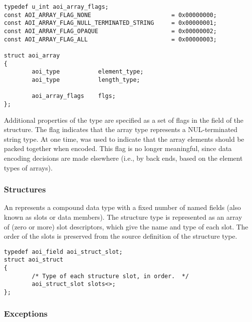 \begin{verbatim}
typedef u_int aoi_array_flags;
const AOI_ARRAY_FLAG_NONE                       = 0x00000000;
const AOI_ARRAY_FLAG_NULL_TERMINATED_STRING     = 0x00000001;
const AOI_ARRAY_FLAG_OPAQUE                     = 0x00000002;
const AOI_ARRAY_FLAG_ALL                        = 0x00000003;

struct aoi_array
{
        aoi_type           element_type;
        aoi_type           length_type;

        aoi_array_flags    flgs;
};
\end{verbatim}

Additional properties of the type are specified as a set of flags in the
 field of the  structure.  The
 flag indicates that the array type
represents a NUL-terminated string type.
At one time,  was used to indicate that the array
elements should be packed together when encoded.  This flag is no longer
meaningful, since data encoding decisions are made elsewhere (i.e., by back
ends, based on the element types of \MINT{} arrays).


\subsubsection{Structures}

An  represents a compound data type with a fixed number of
named fields (also known as slots or data members).  The structure type is
represented as an array of (zero or more) slot descriptors, which give the name
and type of each slot.  The order of the slots is preserved from the \IDL{}
source definition of the structure type.

\begin{verbatim}
typedef aoi_field aoi_struct_slot;
struct aoi_struct
{
        /* Type of each structure slot, in order.  */
        aoi_struct_slot slots<>;
};
\end{verbatim}


\subsubsection{Exceptions}

